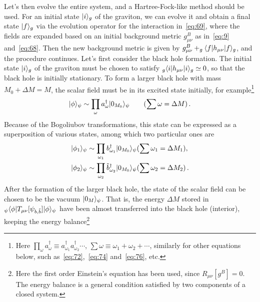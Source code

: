 \documentclass[12pt,a4paper]{article}
\begin{document}
Let's then evolve the entire system, and a Hartree-Fock-like method should be used. For an initial state $\arrowvert i\rangle_g$ of the graviton, we can
evolve it and obtain a final state $\arrowvert f\rangle_g$ via the evolution operator for the interaction in~\eqref{eq:69}, where the fields are expanded
based on an initial background metric $g^{B}_{\mu\nu}$ as in~\eqref{eq:9} and~\eqref{eq:68}. Then the new background metric is
given by $g^{B}_{\mu\nu}+_g\langle f\arrowvert h_{\mu\nu}\arrowvert
f\rangle_g$, and the procedure continues. Let's first consider the black hole formation. The initial state $\arrowvert i\rangle_g$ of the graviton
must be chosen to satisfy $_g\langle i\arrowvert
h_{\mu\nu}\arrowvert i\rangle_g\simeq0$, so that the black hole is initially stationary.
To form a larger black hole with mass $M_0+\Delta M=M$, the scalar field must be in its excited state initially, for example\footnote{Here $\prod_{\omega}a_{\omega}^{\dag}\equiv
a_{\omega_1}^{\dag}a_{\omega_2}^{\dag}\cdots$, $\sum\omega\equiv\omega_1+\omega_2+\cdots$, similarly for other equations below, such as~\eqref{eq:72},~\eqref{eq:74} and~\eqref{eq:76}, etc.}
\begin{equation}
\label{eq:71}
\begin{split}
\arrowvert\phi\rangle_{\psi}\sim
\prod_{\omega}a_{\omega}^{\dag}\arrowvert0_{M_0}\rangle_{\psi}\qquad
(\sum\omega=\Delta M) \,.
\end{split}
\end{equation}
Because of the Bogoliubov transformations, this state can be
expressed as a superposition of various states, among which two
particular ones are
\begin{align}
\label{eq:72}
\arrowvert\phi_1\rangle_{\psi}&\sim
\prod_{\omega_1}b_{\omega_1}^{\dag}\arrowvert0_{M_0}\rangle_{\psi}(\sum\omega_1=\Delta
M_1),\nonumber\\
 \arrowvert\phi_2\rangle_{\psi}&\sim
\prod_{\omega_2}\tilde{b}_{\omega_2}^{\dag}\arrowvert0_{M_0}\rangle_{\psi}(\sum\omega_2=\Delta
M_2) \,.
\end{align}
After the formation of the larger black hole, the state of the
scalar field can be chosen to be the vacuum
$\arrowvert0_M\rangle_{\psi}$. That is, the energy $\Delta M$
stored in $_{\psi}\langle\phi\arrowvert
T_{\mu\nu}[\psi_{b,\tilde{b}}]\arrowvert\phi\rangle_{\psi}$ have been almost
transferred into the black hole (interior), keeping the energy
balance\footnote{Here the first order Einstein's equation has been used, since $R_{\mu\nu}[g^{B}]=0$. The energy balance is a general condition satisfied by two components of a closed system.}
\end{document}
